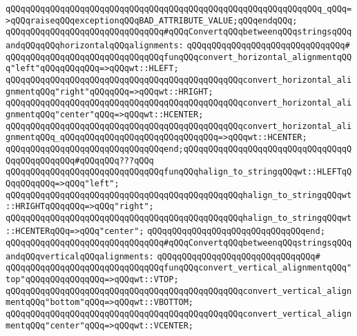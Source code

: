 \verb|qQQqqQQqqQQqqQQqqQQqqQQqqQQqqQQqqQQqqQQqqQQqqQQqqQQqqQQqqQQqqQQq_qQQq=>qQQqraiseqQQqexceptionqQQqBAD_ATTRIBUTE_VALUE;qQQqendqQQq;|\newline
\newline
\verb|qQQqqQQqqQQqqQQqqQQqqQQqqQQqqQQq#qQQqConvertqQQqbetweenqQQqstringsqQQqandqQQqqQQqhorizontalqQQqalignments:|\newline
\verb|qQQqqQQqqQQqqQQqqQQqqQQqqQQqqQQq#|\newline
\verb|qQQqqQQqqQQqqQQqqQQqqQQqqQQqqQQqfunqQQqconvert_horizontal_alignmentqQQq"left"qQQqqQQqqQQq=>qQQqwt::HLEFT;|\newline
\verb|qQQqqQQqqQQqqQQqqQQqqQQqqQQqqQQqqQQqqQQqqQQqqQQqconvert_horizontal_alignmentqQQq"right"qQQqqQQq=>qQQqwt::HRIGHT;|\newline
\verb|qQQqqQQqqQQqqQQqqQQqqQQqqQQqqQQqqQQqqQQqqQQqqQQqconvert_horizontal_alignmentqQQq"center"qQQq=>qQQqwt::HCENTER;|\newline
\verb|qQQqqQQqqQQqqQQqqQQqqQQqqQQqqQQqqQQqqQQqqQQqqQQqconvert_horizontal_alignmentqQQq_qQQqqQQqqQQqqQQqqQQqqQQqqQQqqQQq=>qQQqwt::HCENTER;|\newline
\verb|qQQqqQQqqQQqqQQqqQQqqQQqqQQqqQQqend;qQQqqQQqqQQqqQQqqQQqqQQqqQQqqQQqqQQqqQQqqQQqqQQq#qQQqqQQq???qQQq|\newline
\newline
\verb|qQQqqQQqqQQqqQQqqQQqqQQqqQQqqQQqfunqQQqhalign_to_stringqQQqwt::HLEFTqQQqqQQqqQQq=>qQQq"left";|\newline
\verb|qQQqqQQqqQQqqQQqqQQqqQQqqQQqqQQqqQQqqQQqqQQqqQQqhalign_to_stringqQQqwt::HRIGHTqQQqqQQq=>qQQq"right";|\newline
\verb|qQQqqQQqqQQqqQQqqQQqqQQqqQQqqQQqqQQqqQQqqQQqqQQqhalign_to_stringqQQqwt::HCENTERqQQq=>qQQq"center";|\newline
\verb|qQQqqQQqqQQqqQQqqQQqqQQqqQQqqQQqend;|\newline
\newline
\verb|qQQqqQQqqQQqqQQqqQQqqQQqqQQqqQQq#qQQqConvertqQQqbetweenqQQqstringsqQQqandqQQqverticalqQQqalignments:|\newline
\verb|qQQqqQQqqQQqqQQqqQQqqQQqqQQqqQQq#|\newline
\verb|qQQqqQQqqQQqqQQqqQQqqQQqqQQqqQQqfunqQQqconvert_vertical_alignmentqQQq"top"qQQqqQQqqQQqqQQq=>qQQqwt::VTOP;|\newline
\verb|qQQqqQQqqQQqqQQqqQQqqQQqqQQqqQQqqQQqqQQqqQQqqQQqconvert_vertical_alignmentqQQq"bottom"qQQq=>qQQqwt::VBOTTOM;|\newline
\verb|qQQqqQQqqQQqqQQqqQQqqQQqqQQqqQQqqQQqqQQqqQQqqQQqconvert_vertical_alignmentqQQq"center"qQQq=>qQQqwt::VCENTER;|\newline

